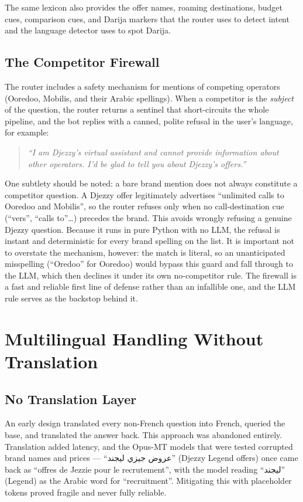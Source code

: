 \documentclass[12pt, a4paper]{report}
\newcommand{\humantext}[1]{#1}      %
\begin{document}
\humantext{The same lexicon also provides the offer names, roaming destinations, budget cues, comparison cues, and Darija markers that the router uses to detect intent and the language detector uses to spot Darija.}

\subsection{The Competitor Firewall}
\humantext{The router includes a safety mechanism for mentions of competing operators (Ooredoo, Mobilis, and their Arabic spellings). When a competitor is the \emph{subject} of the question, the router returns a sentinel that short-circuits the whole pipeline, and the bot replies with a canned, polite refusal in the user's language, for example:}

\begin{quote}
    \textit{``I am Djezzy's virtual assistant and cannot provide information about other operators. I'd be glad to tell you about Djezzy's offers.''}
\end{quote}

\humantext{One subtlety should be noted: a bare brand mention does not always constitute a competitor question. A Djezzy offer legitimately advertises ``unlimited calls to Ooredoo and Mobilis'', so the router refuses only when no call-destination cue (``vers'', ``calls to''\ldots) precedes the brand. This avoids wrongly refusing a genuine Djezzy question. Because it runs in pure Python with no LLM, the refusal is instant and deterministic for every brand spelling on the list. It is important not to overstate the mechanism, however: the match is literal, so an unanticipated misspelling (``Oredoo'' for Ooredoo) would bypass this guard and fall through to the LLM, which then declines it under its own no-competitor rule. The firewall is a fast and reliable first line of defense rather than an infallible one, and the LLM rule serves as the backstop behind it.}

\section{Multilingual Handling Without Translation}

\subsection{No Translation Layer}
\humantext{An early design translated every non-French question into French, queried the base, and translated the answer back. This approach was abandoned entirely. Translation added latency, and the Opus-MT models that were tested corrupted brand names and prices --- ``\textarabic{عروض جيزي ليجند}'' (Djezzy Legend offers) once came back as ``offres de Jezzie pour le recrutement'', with the model reading ``\textarabic{ليجند}'' (Legend) as the Arabic word for ``recruitment''. Mitigating this with placeholder tokens proved fragile and never fully reliable.}
\end{document}
